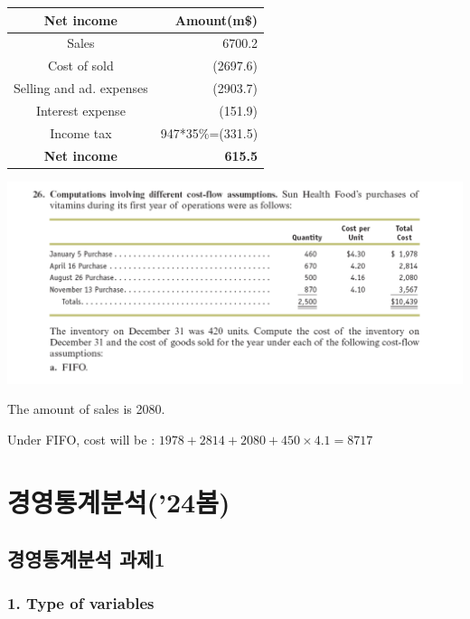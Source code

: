 \documentclass[
  letterpaper,
  DIV=11,
  numbers=noendperiod]{scrreprt}
\begin{document}
\begin{longtable}[]{@{}cr@{}}
\toprule\noalign{}
Net income & Amount(m\$) \\
\midrule\noalign{}
\endhead
\bottomrule\noalign{}
\endlastfoot
Sales & 6700.2 \\
Cost of sold & (2697.6) \\
Selling and ad. expenses & (2903.7) \\
Interest expense & (151.9) \\
Income tax & 947*35\%=(331.5) \\
\textbf{Net income} & \textbf{615.5} \\
\end{longtable}

\includegraphics{images/재무회계9-26.png}

The amount of sales is 2080.

Under FIFO, cost will be : \(1978+2814+2080+450\times 4.1=8717\)

\part{경영통계분석('24봄)}

\chapter*{경영통계분석
과제1}\label{uxacbduxc601uxd1b5uxacc4uxbd84uxc11d-uxacfcuxc81c1}


\section*{1. Type of variables}\label{type-of-variables}

\end{document}
